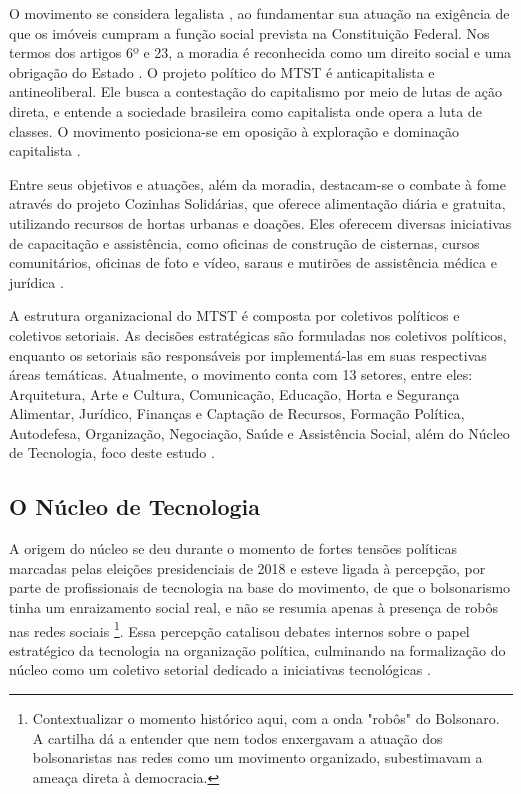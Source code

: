 O movimento se considera legalista \cite{mtst2023cartilha}, ao fundamentar sua atuação na exigência de que os imóveis cumpram a função social prevista na Constituição Federal. Nos termos dos artigos 6º e 23, a moradia é reconhecida como um direito social e uma obrigação do Estado \cite{constituicao1988}. O projeto político do MTST é anticapitalista e antineoliberal. Ele busca a contestação do capitalismo por meio de lutas de ação direta, e entende a sociedade brasileira como capitalista onde opera a luta de classes. O movimento posiciona-se em oposição à exploração e dominação capitalista \cite{goulart2011anticapitalismo}.

Entre seus objetivos e atuações, além da moradia, destacam-se o combate à fome através do projeto Cozinhas Solidárias, que oferece alimentação diária e gratuita, utilizando recursos de hortas urbanas e doações. Eles oferecem diversas iniciativas de capacitação e assistência, como oficinas de construção de cisternas, cursos comunitários, oficinas de foto e vídeo, saraus e mutirões de assistência médica e jurídica \cite{mtst2023cartilha}.

A estrutura organizacional do MTST é composta por coletivos políticos e coletivos setoriais. As decisões estratégicas são formuladas nos coletivos políticos, enquanto os setoriais são responsáveis por implementá-las em suas respectivas áreas temáticas. Atualmente, o movimento conta com 13 setores, entre eles: Arquitetura, Arte e Cultura, Comunicação, Educação, Horta e Segurança Alimentar, Jurídico, Finanças e Captação de Recursos, Formação Política, Autodefesa, Organização, Negociação, Saúde e Assistência Social, além do Núcleo de Tecnologia, foco deste estudo \cite{mtst2023cartilha}.


\subsection{O Núcleo de Tecnologia}
\label{subsec:nucleotec}

A origem do núcleo se deu durante o momento de fortes tensões políticas marcadas pelas eleições presidenciais de 2018 e esteve ligada à percepção, por parte de profissionais de tecnologia na base do movimento, de que o bolsonarismo tinha um enraizamento social real, e não se resumia apenas à presença de robôs nas redes sociais \footnote{Contextualizar o momento histórico aqui, com a onda "robôs" do Bolsonaro. A cartilha dá a entender que nem todos enxergavam a atuação dos bolsonaristas nas redes como um movimento organizado, subestimavam a ameaça direta à democracia. }. Essa percepção catalisou debates internos sobre o papel estratégico da tecnologia na organização política, culminando na formalização do núcleo como um coletivo setorial dedicado a iniciativas tecnológicas \cite{mtst2023cartilha}.

